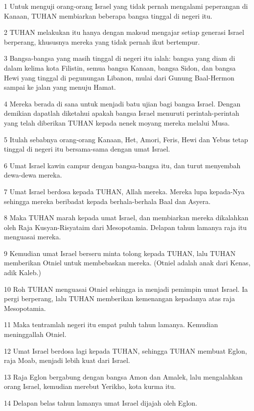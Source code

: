 \par 1 Untuk menguji orang-orang Israel yang tidak pernah mengalami peperangan di Kanaan, TUHAN membiarkan beberapa bangsa tinggal di negeri itu.
\par 2 TUHAN melakukan itu hanya dengan maksud mengajar setiap generasi Israel berperang, khususnya mereka yang tidak pernah ikut bertempur.
\par 3 Bangsa-bangsa yang masih tinggal di negeri itu ialah: bangsa yang diam di dalam kelima kota Filistin, semua bangsa Kanaan, bangsa Sidon, dan bangsa Hewi yang tinggal di pegunungan Libanon, mulai dari Gunung Baal-Hermon sampai ke jalan yang menuju Hamat.
\par 4 Mereka berada di sana untuk menjadi batu ujian bagi bangsa Israel. Dengan demikian dapatlah diketahui apakah bangsa Israel menuruti perintah-perintah yang telah diberikan TUHAN kepada nenek moyang mereka melalui Musa.
\par 5 Itulah sebabnya orang-orang Kanaan, Het, Amori, Feris, Hewi dan Yebus tetap tinggal di negeri itu bersama-sama dengan umat Israel.
\par 6 Umat Israel kawin campur dengan bangsa-bangsa itu, dan turut menyembah dewa-dewa mereka.
\par 7 Umat Israel berdosa kepada TUHAN, Allah mereka. Mereka lupa kepada-Nya sehingga mereka beribadat kepada berhala-berhala Baal dan Asyera.
\par 8 Maka TUHAN marah kepada umat Israel, dan membiarkan mereka dikalahkan oleh Raja Kusyan-Risyataim dari Mesopotamia. Delapan tahun lamanya raja itu menguasai mereka.
\par 9 Kemudian umat Israel berseru minta tolong kepada TUHAN, lalu TUHAN memberikan Otniel untuk membebaskan mereka. (Otniel adalah anak dari Kenas, adik Kaleb.)
\par 10 Roh TUHAN menguasai Otniel sehingga ia menjadi pemimpin umat Israel. Ia pergi berperang, lalu TUHAN memberikan kemenangan kepadanya atas raja Mesopotamia.
\par 11 Maka tentramlah negeri itu empat puluh tahun lamanya. Kemudian meninggallah Otniel.
\par 12 Umat Israel berdosa lagi kepada TUHAN, sehingga TUHAN membuat Eglon, raja Moab, menjadi lebih kuat dari Israel.
\par 13 Raja Eglon bergabung dengan bangsa Amon dan Amalek, lalu mengalahkan orang Israel, kemudian merebut Yerikho, kota kurma itu.
\par 14 Delapan belas tahun lamanya umat Israel dijajah oleh Eglon.
